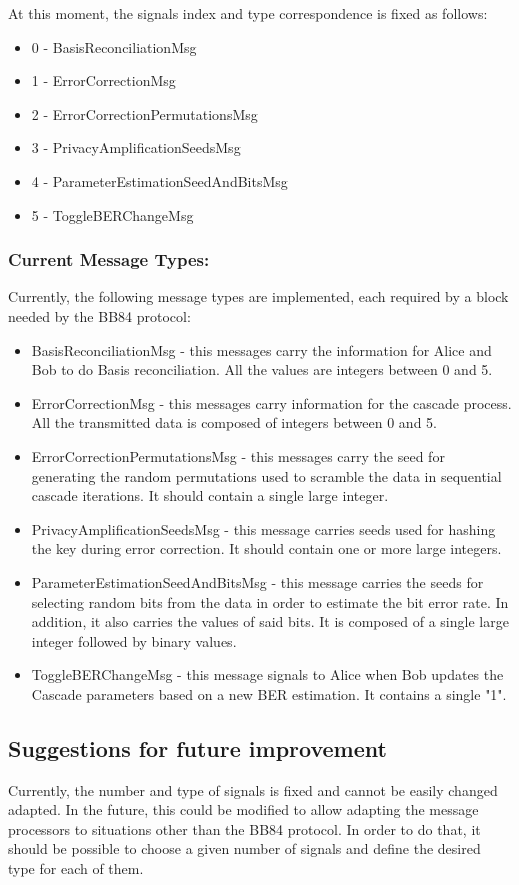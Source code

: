 At this moment, the signals index and type correspondence is fixed as follows:
\begin{itemize}
    \item 0 - BasisReconciliationMsg
    \item 1 - ErrorCorrectionMsg
    \item 2 - ErrorCorrectionPermutationsMsg
    \item 3 - PrivacyAmplificationSeedsMsg
    \item 4 - ParameterEstimationSeedAndBitsMsg
    \item 5 - ToggleBERChangeMsg
\end{itemize}

\subsubsection*{Current Message Types:}

Currently, the following message types are implemented, each required by a block
needed by the BB84 protocol:

\begin{itemize}
    \item BasisReconciliationMsg - this messages carry the information for Alice
    and Bob to do Basis reconciliation. All the values are integers between 0 and
    5.
    \item ErrorCorrectionMsg - this messages carry information for the cascade
    process. All the transmitted data is composed of integers between 0 and 5.
    \item ErrorCorrectionPermutationsMsg - this messages carry the seed for
    generating the random permutations used to scramble the data in sequential
    cascade iterations. It should contain a single large integer.
    \item PrivacyAmplificationSeedsMsg - this message carries seeds used for
    hashing the key during error correction. It should contain one or more large
    integers.
    \item ParameterEstimationSeedAndBitsMsg - this message carries the seeds for
    selecting random bits from the data in order to estimate the bit error rate.
    In addition, it also carries the values of said bits. It is composed of a
    single large integer followed by binary values.
    \item ToggleBERChangeMsg - this message signals to Alice when Bob updates
    the Cascade parameters based on a new BER estimation. It contains a single "1".
\end{itemize}

\subsection*{Suggestions for future improvement}

Currently, the number and type of signals is fixed and cannot be easily changed
adapted. In the future, this could be modified to allow adapting the
message processors to situations other than the BB84 protocol. In order to do
that, it should be possible to choose a given number of signals and define the
desired type for each of them.

